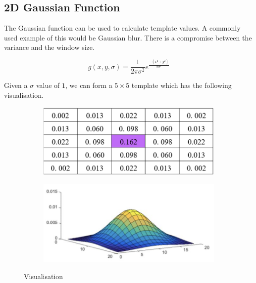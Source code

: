 \subsection{2D Gaussian Function}

The Gaussian function can be used to calculate template values. A commonly used example of this would be Gaussian blur. There is a compromise between the variance and the window size.

\begin{equation}
    g(x,y,\sigma) = \frac{1}{2\pi\sigma^{2}}e^{\frac{-(x^{2}+ y^{2})}{2\sigma^{2}}}
\end{equation}

Given a $\sigma$ value of $1$, we can form a $5\times5$ template which has the following visualisation.

\begin{figure}[ht]
    \centering
    \begin{subfigure}[b]{.5\linewidth}
    \centering
        \includegraphics[scale =0.3]{Images/gausstable.png}
    \end{subfigure}%
    \begin{subfigure}[b]{.5\linewidth}
    \centering
        \includegraphics[scale=0.3]{Images/gaussvisual.png}
    \end{subfigure}
    \caption{Visualisation}
    \label{fig:gauss}
\end{figure}

